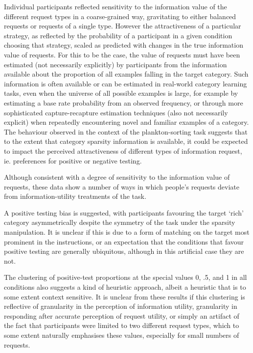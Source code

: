 \documentclass[10pt,letterpaper]{article}
\begin{document}
Individual participants reflected sensitivity to the information value of the different request types in a coarse-grained way, gravitating to either balanced requests or requests of a single type. However the attractiveness of a particular strategy, as reflected by the probability of a participant in a given condition choosing that strategy, scaled as predicted with changes in the true information value of requests. For this to be the case, the value of requests must have been estimated (not necessarily explicitly) by participants from the information available about the proportion of all examples falling in the target category. Such information is often available or can be estimated in real-world category learning tasks, even when the universe of all possible examples is large, for example by estimating a base rate probability from an observed frequency, or through more sophisticated capture-recapture estimation techniques %
(also not necessarily explicit) when repeatedly encountering novel and familiar examples of a category.%
The behaviour observed in the context of the plankton-sorting task suggests that to the extent that category sparsity information is available, it could be expected to impact the perceived attractiveness of different types of information request, ie. preferences for positive or negative testing.

Although consistent with a degree of sensitivity to the information value of requests, these data show a number of ways in which people's requests deviate from information-utility treatments of the task. 

A positive testing bias is suggested, with participants favouring the target `rich' category asymmetrically despite the symmetry of the task under the sparsity manipulation. It is unclear if this is due to a form of matching \cite{evans1998matching} on the target most prominent in the instructions, or an expectation that the conditions that favour positive testing are generally ubiquitous, although in this artificial case they are not.

The clustering of positive-test proportions at the special values 0, .5, and 1 in all conditions also suggests a kind of heuristic approach, albeit a heuristic that is to some extent context sensitive. It is unclear from these results if this clustering is reflective of granularity in the perception of information utility, granularity in responding after accurate perception of request utility, or simply an artifact of the fact that participants were limited to two different request types, which to some extent naturally emphasises these values, especially for small numbers of requests.
\end{document}
